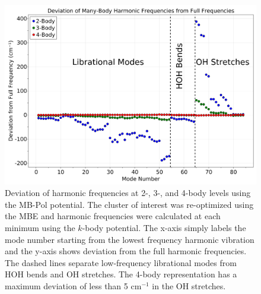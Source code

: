 \documentclass[11pt, proquest]{uwthesis}[2020/02/24]
\let\ce\ch
\begin{document}
\begin{figure}[t]
\uwsinglespace
\begin{center}
\begin{minipage}{0.9\textwidth}
\includegraphics[width=\textwidth]{Figures/Chapter_4/ch4_figure_7.png}
\end{minipage}
\end{center}
\caption[Deviation of harmonic frequencies at 2-, 3-, and 4-body levels using the MB-Pol potential. The \ce{(H2O)_{10}} cluster of interest was re-optimized using the MBE and harmonic frequencies were calculated at each minimum using the $k$-body potential.]{Deviation of harmonic frequencies at 2-, 3-, and 4-body levels using the MB-Pol potential. The \ce{(H2O)_{10}} cluster of interest was re-optimized using the MBE and harmonic frequencies were calculated at each minimum using the $k$-body potential. The x-axis simply labels the mode number starting from the lowest frequency harmonic vibration and the y-axis shows deviation from the full harmonic frequencies. The dashed lines separate low-frequency librational modes from HOH bends and OH stretches. The 4-body representation has a maximum deviation of less than 5 $\mathrm{cm}^{-1}$ in the OH stretches.}
\label{fig:MBE_MD_F7}
\end{figure}
\end{document}
